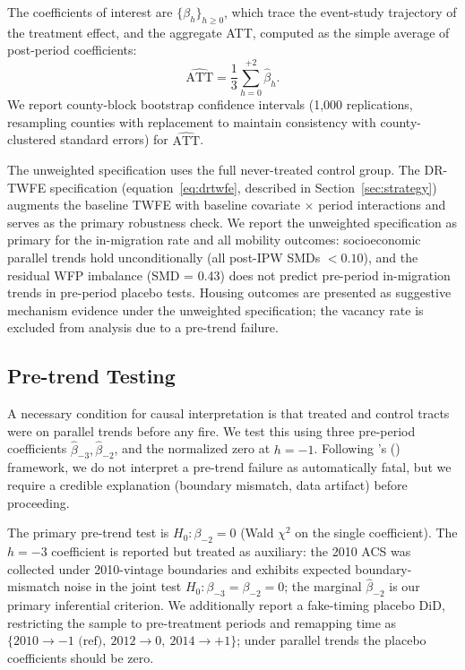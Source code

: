 \documentclass[12pt]{article}
\begin{document}
The coefficients of interest are $\{\beta_h\}_{h \geq 0}$,
which trace the event-study trajectory of the treatment effect,
and the aggregate ATT, computed as the simple average of post-period
coefficients:
\begin{equation}
  \widehat{\text{ATT}} = \frac{1}{3} \sum_{h=0}^{+2} \hat{\beta}_h.
  \label{eq:att}
\end{equation}
We report county-block bootstrap confidence intervals
(1,000 replications, resampling counties with replacement to maintain
consistency with county-clustered standard errors) for
$\widehat{\text{ATT}}$.

The unweighted specification uses the full never-treated control group.
The DR-TWFE specification (equation~\eqref{eq:drtwfe}, described in
Section~\ref{sec:strategy}) augments the baseline TWFE with
baseline covariate $\times$ period interactions and serves as the
primary robustness check.
We report the unweighted specification as primary for the in-migration
rate and all mobility outcomes: socioeconomic parallel trends hold
unconditionally (all post-IPW SMDs $< 0.10$), and the residual WFP
imbalance (SMD = 0.43) does not predict pre-period in-migration trends
in pre-period placebo tests.
Housing outcomes are presented as suggestive mechanism evidence
under the unweighted specification; the vacancy rate is excluded
from analysis due to a pre-trend failure.

\subsection{Pre-trend Testing}

A necessary condition for causal interpretation is that treated and
control tracts were on parallel trends before any fire.
We test this using three pre-period coefficients
$\hat{\beta}_{-3}, \hat{\beta}_{-2}$, and the normalized zero at $h = -1$.
Following \citeauthor{roth2022pretest}'s (\citeyear{roth2022pretest})
framework, we do not interpret a pre-trend failure as automatically fatal,
but we require a credible explanation (boundary mismatch,
data artifact) before proceeding.

The primary pre-trend test is $H_0 \colon \beta_{-2} = 0$
(Wald $\chi^2$ on the single coefficient).
The $h = -3$ coefficient is reported but treated as auxiliary:
the 2010 ACS was collected under 2010-vintage boundaries
and exhibits expected boundary-mismatch noise in the
joint test $H_0 \colon \beta_{-3} = \beta_{-2} = 0$;
the marginal $\hat{\beta}_{-2}$ is our primary inferential criterion.
We additionally report a fake-timing placebo DiD,
restricting the sample to pre-treatment periods and remapping time as
$\{2010 \to -1 \text{ (ref)},\ 2012 \to 0,\ 2014 \to +1\}$;
under parallel trends the placebo coefficients should be zero.
\end{document}
